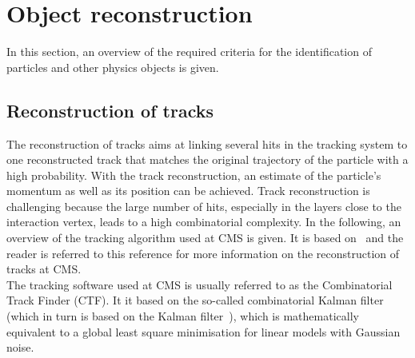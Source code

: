 \section{Object reconstruction}
\label{sec:ObjectReconstruction}
In this section, an overview of the required criteria for the identification of particles and other physics objects is given.

\subsection{Reconstruction of tracks}
\label{subsec:TrackReconstruction}
The reconstruction of tracks aims at linking several hits in the tracking system to one reconstructed track that matches the original trajectory of the particle with a high probability.
With the track reconstruction, an estimate of the particle's momentum as well as its position can be achieved.
Track reconstruction is challenging because the large number of hits, especially in the layers close to the interaction vertex, leads to a high combinatorial complexity. 
In the following, an overview of the tracking algorithm used at CMS is given.
It is based on~\cite{bib:CMS:tracking_8TeV} and the reader is referred to this reference for more information on the reconstruction of tracks at CMS.\\

The tracking software used at CMS is usually referred to as the Combinatorial Track Finder (CTF).
It it based on the so-called combinatorial Kalman filter~\cite{bib:TrackAlgorithm_1989,bib:TrackAlgorithm_1990,bib:TrackAlgorithm_1997} (which in turn is based on the Kalman filter~\cite{bib:KalmanFilter_1987}), which is mathematically equivalent to a global least square minimisation for linear models with Gaussian noise.

